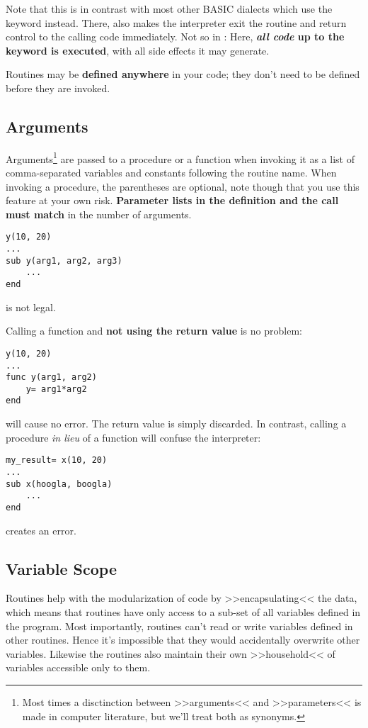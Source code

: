 Note that this is in contrast with most other BASIC dialects which use
the keyword  instead. There,  also makes the
interpreter exit the routine and return control to the calling code immediately.
Not so in \SB: Here, \textbf{\emph{all code} up to the  keyword
is executed}, with all side effects it may generate.

Routines may be \textbf{defined anywhere} in your code; they don't need to be
defined before they are invoked.

\subsection{Arguments}

Arguments\footnote{Most times a disctinction between >>arguments<< and
>>parameters<< is made in computer literature, but we'll treat both as
synonyms.} are passed to a procedure or a function when invoking it as a
list of comma-separated variables and constants following the routine
name. When invoking a procedure, the parentheses are optional, note
though that you use this feature at your own risk. \textbf{Parameter
lists in the definition and the call must match} in the number of
arguments.

\begin{lstlisting}
y(10, 20)
...
sub y(arg1, arg2, arg3)
	...
end
\end{lstlisting}

is not legal.

Calling a function and \textbf{not using the return value} is no problem:

\begin{lstlisting}
y(10, 20)
...
func y(arg1, arg2)
	y= arg1*arg2
end
\end{lstlisting}

will cause no error. The return value is simply discarded. In contrast,
calling a procedure \emph{in lieu} of a function will confuse the
interpreter:

\begin{lstlisting}
my_result= x(10, 20)
...
sub x(hoogla, boogla)
	...
end
\end{lstlisting}

creates an error.

\subsection{Variable Scope}

Routines help with the modularization of code by >>encapsulating<< the
data, which means that routines have only access to a sub-set of all
variables defined in the program. Most importantly, routines can't read
or write variables defined in other routines. Hence it's impossible that
they would accidentally overwrite other variables. Likewise the routines
also maintain their own >>household<< of variables accessible only to
them.

